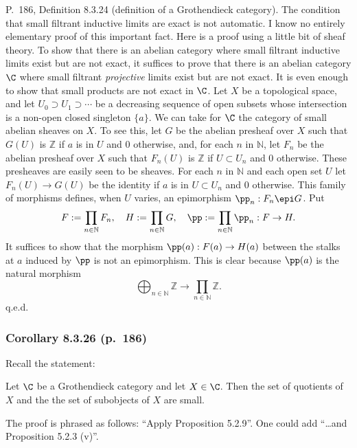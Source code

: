\documentclass[12pt]{article}
\theoremstyle{remark}
\theoremstyle{definition}
\begin{document}
%

\begin{s} 
P.~186, Definition 8.3.24 (definition of a Grothendieck category). The condition that small filtrant inductive limits are exact is not automatic. I know no entirely elementary proof of this important fact. Here is a proof using a little bit of sheaf theory. To show that there is an abelian category where small filtrant inductive limits exist but are not exact, it suffices to prove that there is an abelian category $\C$ where small filtrant {\em projective} limits exist but are not exact. It is even enough to show that small products are not exact in $\C$. Let $X$ be a topological space, and let $U_0\supset U_1\supset\cdots$ be a decreasing sequence of open subsets whose intersection is a non-open closed singleton $\{a\}$. We can take for $\C$ the category of small abelian sheaves on $X$. To see this, let $G$ be the abelian presheaf over $X$ such that $G(U)$ is $\mathbb Z$ if $a$ is in $U$ and 0 otherwise, and, for each $n$ in $\mathbb N$, let $F_n$ be the abelian presheaf over $X$ such that $F_n(U)$ is $\mathbb Z$ if $U\subset U_n$ and 0 otherwise. These presheaves are easily seen to be sheaves. For each $n$ in $\mathbb N$ and each open set $U$ let $F_n(U)\to G(U)$ be the identity if $a$ is in $U\subset U_n$ and 0 otherwise. This family of morphisms defines, when $U$ varies, an epimorphism $\pp_n:F_n\epi G$. Put 
$$
F:=\prod_{n\in\mathbb N}F_n,\quad H:=\prod_{n\in\mathbb N}G,\quad\pp:=\prod_{n\in\mathbb N}\pp_n:F\to H.
$$ 
It suffices to show that the morphism $\pp(a):F(a)\to H(a)$ between the stalks at $a$ induced by $\pp$ is not an epimorphism. This is clear because $\pp(a)$ is the natural morphism 
$$
\bigoplus_{n\in\mathbb N}\mathbb Z\to\prod_{n\in\mathbb N}\mathbb Z.
$$
q.e.d.
\end{s}

%

\subsubsection{Corollary 8.3.26 (p.~186)}
 
Recall the statement:

Let $\C$ be a Grothendieck category and let $X\in\C$. Then the set of quotients of $X$ and the the set of subobjects of $X$ are small. 

The proof is phrased as follows: ``Apply Proposition 5.2.9''. One could add ``\dots and Proposition 5.2.3 (v)''.

%
\end{document}
